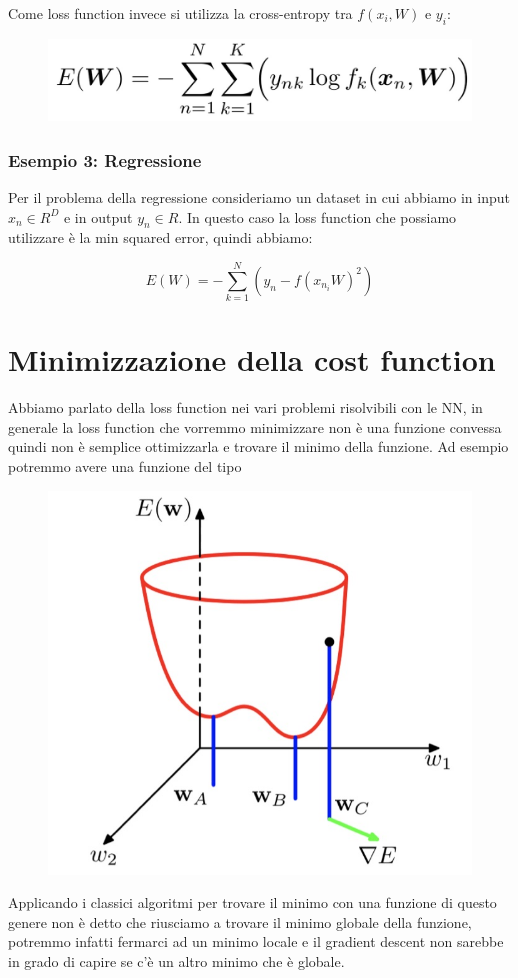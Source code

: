 \documentclass[14pt]{extreport}
\begin{document}
Come loss function invece si utilizza la cross-entropy tra $f(x_i, W)$ e $y_i$:
\begin{figure}[H]
\centering
\includegraphics[width=0.5\linewidth]{376.jpeg}
\end{figure}

\subsubsection{Esempio 3: Regressione}

Per il problema della regressione consideriamo un dataset in cui abbiamo in input $x_n \in R^D$ e in output $y_n \in R$. In questo caso la loss
function che possiamo utilizzare è la min squared error, quindi abbiamo:

$$E(W) = -\sum_{k=1}^N(y_n-f(x_{n_{i}} W)^2)$$ 

\section{Minimizzazione della cost function}

Abbiamo parlato della loss function nei vari problemi risolvibili con le NN, in generale la loss function che vorremmo minimizzare non è una funzione
convessa quindi non è semplice ottimizzarla e trovare il minimo della funzione. Ad esempio potremmo avere una funzione del tipo

\begin{figure}[H]
\centering
\includegraphics[width=0.4\linewidth]{377.jpeg}
\end{figure}

Applicando i classici algoritmi per trovare il minimo con una funzione di questo genere non è detto che riusciamo a trovare il minimo globale della
funzione, potremmo infatti fermarci ad un minimo locale e il gradient descent non sarebbe in grado di capire se c'è un altro minimo che è globale.
\end{document}
